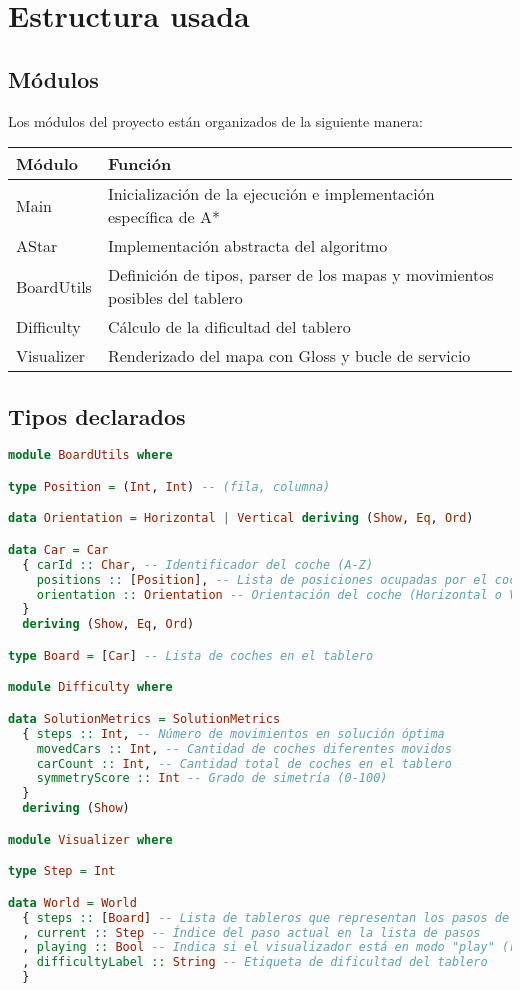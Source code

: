 \documentclass{article}
\begin{document}
\section*{Estructura usada}
\subsection{Módulos}
Los módulos del proyecto están organizados de la siguiente manera:

\begin{table}[h!]
\centering
\begin{tabular}{|l|l|}
\hline
\textbf{Módulo} & \textbf{Función} \\
\hline
Main & Inicialización de la ejecución e implementación específica de A* \\
AStar & Implementación abstracta del algoritmo \\
BoardUtils & Definición de tipos, parser de los mapas y movimientos posibles del tablero \\
Difficulty & Cálculo de la dificultad del tablero \\
Visualizer & Renderizado del mapa con Gloss y bucle de servicio \\
\hline
\end{tabular}
\end{table}


\subsection{Tipos declarados}
\begin{lstlisting}[language=Haskell]
module BoardUtils where

type Position = (Int, Int) -- (fila, columna)

data Orientation = Horizontal | Vertical deriving (Show, Eq, Ord)

data Car = Car
  { carId :: Char, -- Identificador del coche (A-Z)
    positions :: [Position], -- Lista de posiciones ocupadas por el coche
    orientation :: Orientation -- Orientación del coche (Horizontal o Vertical)
  }
  deriving (Show, Eq, Ord)

type Board = [Car] -- Lista de coches en el tablero

module Difficulty where

data SolutionMetrics = SolutionMetrics
  { steps :: Int, -- Número de movimientos en solución óptima
    movedCars :: Int, -- Cantidad de coches diferentes movidos
    carCount :: Int, -- Cantidad total de coches en el tablero
    symmetryScore :: Int -- Grado de simetría (0-100)
  }
  deriving (Show)

module Visualizer where

type Step = Int

data World = World
  { steps :: [Board] -- Lista de tableros que representan los pasos de la solución
  , current :: Step -- Índice del paso actual en la lista de pasos
  , playing :: Bool -- Indica si el visualizador está en modo "play" (reproducción automática)
  , difficultyLabel :: String -- Etiqueta de dificultad del tablero
  }
\end{lstlisting}
\end{document}
